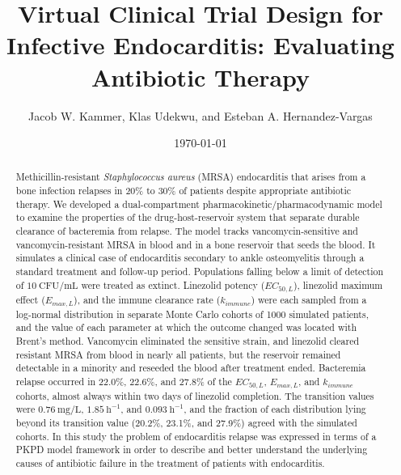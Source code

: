 \documentclass[12pt, draftcls, onecolumn]{IEEEtran}
\title{Virtual Clinical Trial Design for Infective Endocarditis: Evaluating Antibiotic Therapy}
\author{Jacob W. Kammer, Klas Udekwu, and Esteban A. Hernandez-Vargas}
\date{\today} %
\begin{document}
\maketitle

\begin{abstract}
Methicillin-resistant \textit{Staphylococcus aureus} (MRSA) endocarditis that
arises from a bone infection relapses in 20\% to 30\% of patients despite
appropriate antibiotic therapy. We developed a dual-compartment
pharmacokinetic/pharmacodynamic model to examine the properties of the
drug-host-reservoir system that separate durable clearance of bacteremia from
relapse. The model tracks vancomycin-sensitive and vancomycin-resistant MRSA
in blood and in a bone reservoir that seeds the blood.  It simulates a
clinical case of endocarditis secondary to ankle osteomyelitis through a standard treatment and follow-up period. Populations
falling below a limit of detection of $10~\mathrm{CFU/mL}$ were treated as
extinct. Linezolid potency ($EC_{50,L}$), linezolid maximum effect
($E_{max,L}$), and the immune clearance rate ($k_{immune}$) were each sampled
from a log-normal distribution in separate Monte Carlo cohorts of 1000
simulated patients, and the value of each parameter at which the outcome
changed was located with Brent's method. Vancomycin eliminated the sensitive
strain, and linezolid cleared resistant MRSA from blood in nearly all
patients, but the reservoir remained detectable in a minority and reseeded
the blood after treatment ended. Bacteremia relapse occurred in 22.0\%, 22.6\%, and
27.8\% of the $EC_{50,L}$, $E_{max,L}$, and $k_{immune}$ cohorts, almost
always within two days of linezolid completion.  The transition values were $0.76~\mathrm{mg/L}$,
$1.85~\mathrm{h}^{-1}$, and $0.093~\mathrm{h}^{-1}$, and the fraction of each
distribution lying beyond its transition value (20.2\%, 23.1\%, and 27.9\%)
agreed with the simulated cohorts. In this study the problem of endocarditis relapse was expressed in terms of a PKPD model framework in order to describe and better understand the underlying causes of antibiotic failure in the treatment of patients with endocarditis.
\end{abstract}
\end{document}
